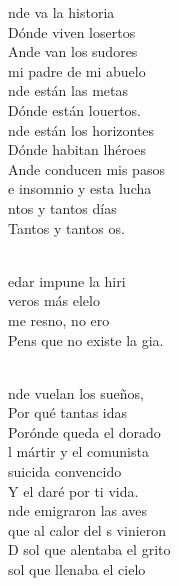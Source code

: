\documentclass[12pt]{article}
\begin{document}
\begin{multicols*}{2}
\begin{cancion}%
	nde va la historia  \\
	Dónde viven losertos \\
	Ande van los sudores  \\
	mi padre de mi abuelo \\
	nde están las metas  \\
	Dónde están louertos. \\
\jump
	nde están los horizontes \\
	Dónde habitan lhéroes \\
	Ande conducen mis pasos  \\
	e insomnio y esta lucha \\
	ntos y tantos días \\
	Tantos y tantos os. \\\jump\\
	\begin{chorus}%
	edar impune la hiri\\
	 veros más elelo\\
	 me resno, no ero \\
	Pens que no existe la gia. \\
	\end{chorus}%
	\jump\\
	nde vuelan los sueños,  \\
	Por qué tantas idas \\
	Porónde queda el dorado \\
	l mártir y el comunista \\
	 suicida convencido \\
	Y el daré por ti vida.\\
\jump
	nde emigraron las aves \\
	que al calor del s vinieron \\
	D sol que alentaba el grito \\
	 sol que llenaba el cielo \\

\end{cancion}
\end{multicols*}
\end{document}
